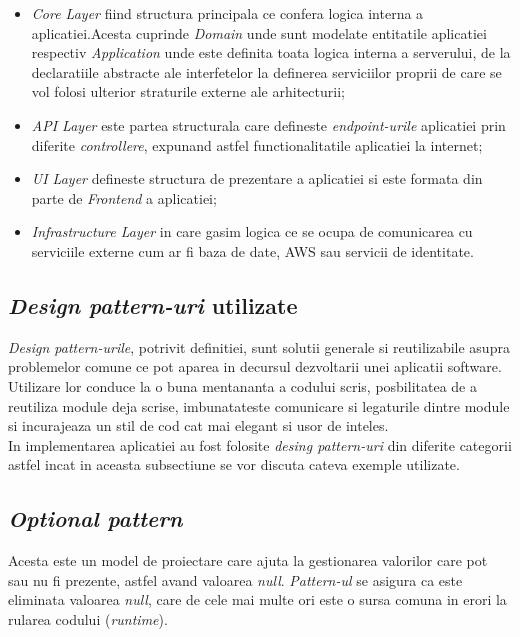\begin{itemize}
	\item  \textit{Core Layer} fiind structura principala ce confera logica interna a aplicatiei.Acesta cuprinde \textit{Domain} unde sunt modelate entitatile aplicatiei respectiv \textit{Application} unde este definita toata logica interna a serverului,
	de la declaratiile abstracte ale interfetelor la definerea serviciilor proprii de care se vol folosi ulterior straturile externe ale arhitecturii;
	
	\item \textit{API Layer} este partea structurala care defineste \textit{endpoint-urile} aplicatiei prin diferite \textit{controllere}, expunand astfel functionalitatile aplicatiei la internet;
	
  	\item \textit{UI Layer} defineste structura de prezentare a aplicatiei si este formata din parte de \textit{Frontend} a aplicatiei;
  
 	 \item \textit{Infrastructure Layer} in care gasim logica ce se ocupa de comunicarea cu serviciile externe cum ar fi baza de date, AWS sau servicii de identitate.
 	 
\end{itemize}

\subsection*{\textit{Design pattern-uri} utilizate}

\textit{Design pattern-urile}, potrivit definitiei, sunt solutii generale si reutilizabile asupra problemelor comune ce pot aparea in decursul dezvoltarii unei aplicatii software.\\
Utilizare lor conduce la o buna mentananta a codului scris, posbilitatea de a reutiliza module deja scrise, imbunatateste comunicare si legaturile dintre module si incurajeaza un stil de cod cat mai elegant si usor de inteles.\\
In implementarea aplicatiei au fost folosite \textit{desing pattern-uri} din diferite categorii astfel incat in aceasta subsectiune se vor discuta cateva exemple utilizate.

\subsection*{\textit{Optional pattern}}
Acesta este un model de proiectare care ajuta la gestionarea valorilor care pot sau nu fi prezente, astfel avand valoarea \textit{null}. \textit{Pattern-ul} se asigura ca este eliminata valoarea \textit{null}, care de cele mai multe ori este o sursa comuna in erori la rularea codului (\textit{runtime}).

